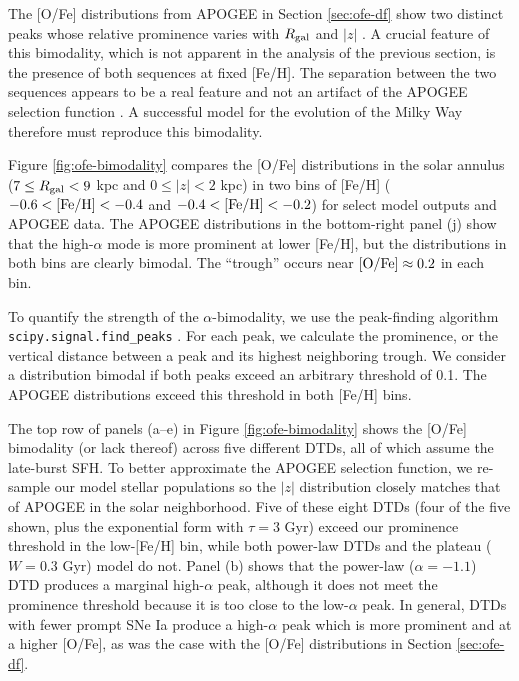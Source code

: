 \documentclass[twocolumn,twocolappendix,linenumbers]{aastex631}
\begin{document}
The [O/Fe] distributions from APOGEE in Section \ref{sec:ofe-df}
show two distinct peaks whose relative prominence varies with $R_{\rm gal}$ and $|z|$ \citep[see also Figure 4 of][]{Hayden2015-ChemicalCartography}. A crucial feature of this bimodality, which is not apparent in the analysis of the previous section, is the presence of both sequences at fixed [Fe/H]. The separation between the two sequences appears to be a real feature and not an artifact of the APOGEE selection function \citep{Vincenzo2021-AlphaDistribution}. A successful model for the evolution of the Milky Way therefore must reproduce this bimodality.

Figure \ref{fig:ofe-bimodality} compares the [O/Fe] distributions in the solar annulus ($7\leq R_{\rm gal}<9$ kpc and $0\leq|z|<2$ kpc) in two bins of [Fe/H] ($-0.6<{\rm [Fe/H]}<-0.4$ and $-0.4<{\rm [Fe/H]}<-0.2$) for select model outputs and APOGEE data. The APOGEE distributions in the bottom-right panel (j) show that the high-$\alpha$ mode is more prominent at lower [Fe/H], but the distributions in both bins are clearly bimodal. The ``trough'' occurs near ${\rm [O/Fe]}\approx0.2$ in each bin.

To quantify the strength of the $\alpha$-bimodality, we use the peak-finding algorithm {\tt scipy.signal.find\_peaks} \citep{2020SciPy-NMeth}. For each peak, we calculate the prominence, or the vertical distance between a peak and its highest neighboring trough. We consider a distribution bimodal if both peaks exceed an arbitrary threshold of 0.1. The APOGEE distributions exceed this threshold in both [Fe/H] bins.

The top row of panels (a--e) in Figure \ref{fig:ofe-bimodality} shows the [O/Fe] bimodality (or lack thereof) across five different DTDs, all of which assume the late-burst SFH. To better approximate the APOGEE selection function, we re-sample our model stellar populations so the $|z|$ distribution closely matches that of APOGEE in the solar neighborhood. 
Five of these eight DTDs (four of the five shown, plus the exponential form with $\tau=3$ Gyr) exceed our prominence threshold in the low-[Fe/H] bin, while both power-law DTDs and the plateau ($W=0.3$ Gyr) model do not. Panel (b) shows that the power-law ($\alpha=-1.1$) DTD produces a marginal high-$\alpha$ peak, although it does not meet the prominence threshold because it is too close to the low-$\alpha$ peak. In general, DTDs with fewer prompt SNe Ia produce a high-$\alpha$ peak which is more prominent and at a higher [O/Fe], as was the case with the [O/Fe] distributions in Section \ref{sec:ofe-df}. 
\end{document}
